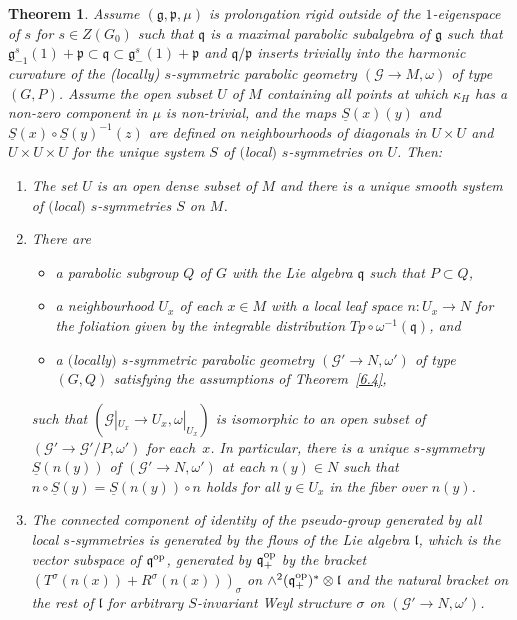 \documentclass[pdftex]{sigma}
\newcommand{\om}{\omega}
\newcommand{\si}{\sigma}
\newcommand{\un}{\underline}
\newcommand{\ba}{\mathcal{G}}
\newcommand{\fg}{\mathfrak g}
\newcommand{\fv}{\mathfrak q}
\newcommand{\fp}{\mathfrak p}
\newcommand{\fl}{\mathfrak l}
\numberwithin{equation}{section}
\newtheorem{Theorem}{Theorem}[section]
\begin{document}
\begin{Theorem}\label{6.5}
Assume $(\fg,\fp,\mu)$ is prolongation rigid outside of the $1$-eigenspace of $s$ for $s\in Z(G_0)$ such that $\fv$ is a maximal parabolic subalgebra of $\fg$ such that $\fg_{-1}^s(1)+\fp\subset \fv\subset \fg_{-}^s(1)+\fp$ and $\fv/\fp$ inserts trivially into the harmonic curvature of the (locally) $s$-symmetric parabolic geometry $(\ba\to M,\om)$ of type $(G,P)$. Assume the open subset $U$ of $M$ containing all points at which $\kappa_H$ has a non-zero component in $\mu$ is non-trivial, and the maps $\un S(x)(y)$ and $\un S(x)\circ \un S(y)^{-1}(z)$ are defined on neighbourhoods of diagonals in $U\times U$ and $U\times U\times U$ for the unique system $S$ of $($local$)$ $s$-symmetries on $U$. Then:
\begin{enumerate}\itemsep=0pt
\item[$1.$] The set $U$ is an open dense subset of $M$ and there is a unique smooth system of $($local$)$ $s$-symmetries $S$ on $M$.
\item[$2.$] There are
\begin{itemize}\itemsep=0pt
\item a parabolic subgroup $Q$ of $G$ with the Lie algebra $\fv$ such that $P\subset Q$,
\item a neighbourhood $U_x$ of each $x\in M$ with a local leaf space $n\colon U_x\to N$ for the foliation given by the integrable distribution $Tp\circ \om^{-1}(\fv)$, and
\item a $($locally$)$ $s$-symmetric parabolic geometry $(\ba'\to N,\om')$ of type $(G,Q)$ satisfying the assumptions of Theorem~{\rm \ref{6.4}},
\end{itemize}
such that $(\ba|_{U_x}\to U_x,\om|_{U_x})$ is isomorphic to an open subset of $(\ba'\to \ba'/P,\om')$ for each~$x$. In particular, there is a unique $s$-symmetry $\un S(n(y))$ of $(\ba'\to N,\om')$ at each $n(y)\in N$ such that $n\circ \un S(y)=\un S(n(y))\circ n$ holds for all $y\in U_x$ in the fiber over $n(y)$.
\item[$3.$] The connected component of identity of the pseudo-group generated by all local $s$-sym\-met\-ries is generated by the flows of the Lie algebra $\fl$, which is the vector subspace of $\fv^{\rm op}$, generated by $\fv^{\rm op}_+$ by the bracket $(T^\si(n(x))+R^\si(n(x)))_\si$
on $\wedge^2 (\fv^{\rm op}_+)^*\otimes \fl$ and the natural bracket on the rest of $\fl$ for arbitrary $S$-invariant Weyl structure $\si$ on $(\ba'\to N,\om')$.


\end{enumerate}
\end{Theorem}
\end{document}
